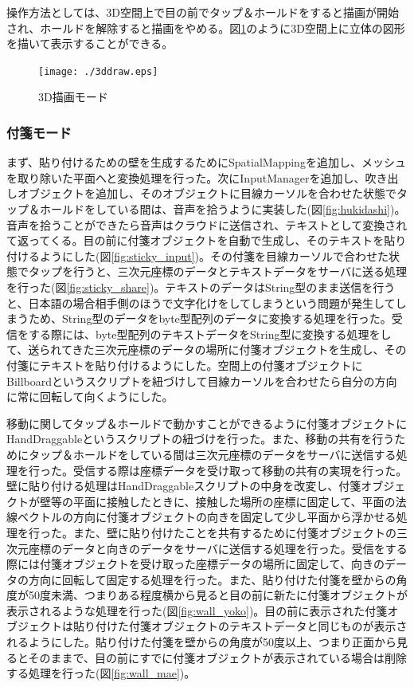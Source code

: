 \documentclass[11pt,a4j, titlepage]{jarticle} %
\begin{document}
操作方法としては、3D空間上で目の前でタップ＆ホールドをすると描画が開始され、ホールドを解除すると描画をやめる。図\ref{fig:3ddraw}のように3D空間上に立体の図形を描いて表示することができる。

\begin{figure}[H]
  \begin{center}
    \texttt{[image: ./3ddraw.eps]}
    \caption{3D描画モード}
    \label{fig:3ddraw}
  \end{center}
\end{figure}

\subsubsection{付箋モード}
まず、貼り付けるための壁を生成するためにSpatialMappingを追加し、メッシュを取り除いた平面へと変換処理を行った\cite{holograms230}。次にInputManagerを追加し、吹き出しオブジェクトを追加し、そのオブジェクトに目線カーソルを合わせた状態でタップ＆ホールドをしている間は、音声を拾うように実装した(図\ref{fig:hukidashi})。音声を拾うことができたら音声はクラウドに送信され、テキストとして変換されて返ってくる。目の前に付箋オブジェクトを自動で生成し、そのテキストを貼り付けるようにした(図\ref{fig:sticky_input})。その付箋を目線カーソルで合わせた状態でタップを行うと、三次元座標のデータとテキストデータをサーバに送る処理を行った(図\ref{fig:sticky_share})。テキストのデータはString型のまま送信を行うと、日本語の場合相手側のほうで文字化けをしてしまうという問題が発生してしまうため、String型のデータをbyte型配列のデータに変換する処理を行った。受信をする際には、byte型配列のテキストデータをString型に変換する処理をして、送られてきた三次元座標のデータの場所に付箋オブジェクトを生成し、その付箋にテキストを貼り付けるようにした。空間上の付箋オブジェクトにBillboardというスクリプトを紐づけして目線カーソルを合わせたら自分の方向に常に回転して向くようにした。

移動に関してタップ＆ホールドで動かすことができるように付箋オブジェクトにHandDraggableというスクリプトの紐づけを行った。また、移動の共有を行うためにタップ＆ホールドをしている間は三次元座標のデータをサーバに送信する処理を行った。受信する際は座標データを受け取って移動の共有の実現を行った。壁に貼り付ける処理はHandDraggableスクリプトの中身を改変し、付箋オブジェクトが壁等の平面に接触したときに、接触した場所の座標に固定して、平面の法線ベクトルの方向に付箋オブジェクトの向きを固定して少し平面から浮かせる処理を行った。また、壁に貼り付けたことを共有するために付箋オブジェクトの三次元座標のデータと向きのデータをサーバに送信する処理を行った。受信をする際には付箋オブジェクトを受け取った座標データの場所に固定して、向きのデータの方向に回転して固定する処理を行った。また、貼り付けた付箋を壁からの角度が50度未満、つまりある程度横から見ると目の前に新たに付箋オブジェクトが表示されるような処理を行った(図\ref{fig:wall_yoko})。目の前に表示された付箋オブジェクトは貼り付けた付箋オブジェクトのテキストデータと同じものが表示されるようにした。貼り付けた付箋を壁からの角度が50度以上、つまり正面から見るとそのままで、目の前にすでに付箋オブジェクトが表示されている場合は削除する処理を行った(図\ref{fig:wall_mae})。
\end{document}
